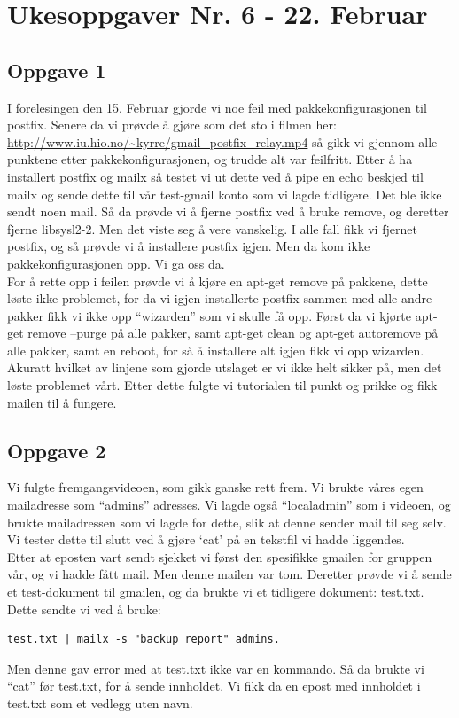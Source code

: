 \documentclass[a4paper, norsk, 12pt]{article}
\begin{document}
\section{Ukesoppgaver Nr. 6 - 22. Februar}
\subsection{Oppgave 1}
I forelesingen den 15. Februar gjorde vi noe feil med pakkekonfigurasjonen til postfix. Senere da vi prøvde å gjøre som det sto i filmen her: \url{http://www.iu.hio.no/~kyrre/gmail_postfix_relay.mp4}
så gikk vi gjennom alle punktene etter pakkekonfigurasjonen, og trudde alt var feilfritt. Etter å ha installert postfix og mailx så testet vi ut dette ved å pipe en echo beskjed til mailx og sende dette til vår test-gmail konto som vi lagde tidligere. Det ble ikke sendt noen mail. Så da prøvde vi å fjerne postfix ved å bruke remove, og deretter fjerne libsysl2-2. Men det viste seg å vere vanskelig. I alle fall fikk vi fjernet postfix, og så prøvde vi å installere postfix igjen. Men da kom ikke pakkekonfigurasjonen opp. Vi ga oss da.\\

For å rette opp i feilen prøvde vi å kjøre en apt-get remove på pakkene, dette løste ikke problemet, for da vi igjen installerte postfix sammen med alle andre pakker fikk vi ikke opp “wizarden” som vi skulle få opp. Først da vi kjørte apt-get remove --purge på alle pakker, samt apt-get clean og apt-get autoremove på alle pakker, samt en reboot, for så å installere alt igjen fikk vi opp wizarden. Akuratt hvilket av linjene som gjorde utslaget er vi ikke helt sikker på, men det løste problemet vårt. Etter dette fulgte vi tutorialen til punkt og prikke og fikk mailen til å fungere.

\subsection{Oppgave 2}
Vi fulgte fremgangsvideoen, som gikk ganske rett frem. Vi brukte våres egen mailadresse som “admins” adresses. Vi lagde også “localadmin” som i videoen, og brukte mailadressen som vi lagde for dette, slik at denne sender mail til seg selv. Vi tester dette til slutt ved å gjøre ‘cat’ på en tekstfil vi hadde liggendes.\\

Etter at eposten vart sendt sjekket vi først den spesifikke gmailen for gruppen vår, og vi hadde fått mail. Men denne mailen var tom. Deretter prøvde vi å sende et test-dokument til gmailen, og da brukte vi et tidligere dokument: test.txt. Dette sendte vi ved å bruke:
\begin{verbatim}
test.txt | mailx -s "backup report" admins. 
\end{verbatim}
Men denne gav error med at test.txt ikke var en kommando. Så da brukte vi “cat” før test.txt, for å sende innholdet. Vi fikk da en epost med innholdet i test.txt som et vedlegg uten navn.
\end{document}
